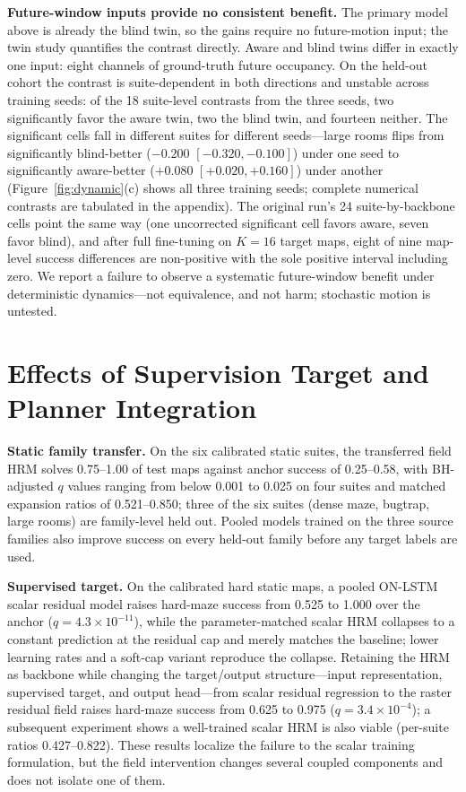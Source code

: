 \documentclass[letterpaper]{article} %
\begin{document}
\textbf{Future-window inputs provide no consistent benefit.} The primary model above is already the blind twin, so the gains require no future-motion input; the twin study quantifies the contrast directly. Aware and blind twins differ in exactly one input: eight channels of ground-truth future occupancy. On the held-out cohort the contrast is suite-dependent in both directions and unstable across training seeds: of the 18 suite-level contrasts from the three seeds, two significantly favor the aware twin, two the blind twin, and fourteen neither. The significant cells fall in different suites for different seeds---large rooms flips from significantly blind-better ($-0.200$ $[-0.320,-0.100]$) under one seed to significantly aware-better ($+0.080$ $[+0.020,+0.160]$) under another (Figure~\ref{fig:dynamic}(c) shows all three training seeds; complete numerical contrasts are tabulated in the appendix). The original run's 24 suite-by-backbone cells point the same way (one uncorrected significant cell favors aware, seven favor blind), and after full fine-tuning on $K{=}16$ target maps, eight of nine map-level success differences are non-positive with the sole positive interval including zero. We report a failure to observe a systematic future-window benefit under deterministic dynamics---not equivalence, and not harm; stochastic motion is untested.

\section{Effects of Supervision Target and Planner Integration}

\textbf{Static family transfer.} On the six calibrated static suites, the transferred field HRM solves 0.75--1.00 of test maps against anchor success of 0.25--0.58, with BH-adjusted $q$ values ranging from below 0.001 to 0.025 on four suites and matched expansion ratios of 0.521--0.850; three of the six suites (dense maze, bugtrap, large rooms) are family-level held out. Pooled models trained on the three source families also improve success on every held-out family before any target labels are used.

\textbf{Supervised target.} On the calibrated hard static maps, a pooled ON-LSTM scalar residual model raises hard-maze success from 0.525 to 1.000 over the anchor ($q=4.3\times10^{-11}$), while the parameter-matched scalar HRM collapses to a constant prediction at the residual cap and merely matches the baseline; lower learning rates and a soft-cap variant reproduce the collapse. Retaining the HRM as backbone while changing the target/output structure---input representation, supervised target, and output head---from scalar residual regression to the raster residual field raises hard-maze success from 0.625 to 0.975 ($q=3.4\times10^{-4}$); a subsequent experiment shows a well-trained scalar HRM is also viable (per-suite ratios 0.427--0.822). These results localize the failure to the scalar training formulation, but the field intervention changes several coupled components and does not isolate one of them.
\end{document}
